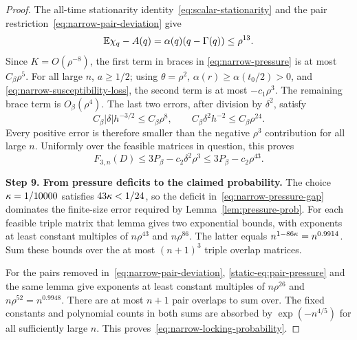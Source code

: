 \begin{proof}
The all-time stationarity identity~\eqref{eq:scalar-stationarity}
and the pair restriction~\eqref{eq:narrow-pair-deviation} give
\[
 \mathbb E\chi_q-A(q)=\alpha(q)(q-\Gamma(q))\le\rho^{13}.
\]
Since $K=O(\rho^{-8})$, the first term in braces in
\eqref{eq:narrow-pressure} is at most $C_\beta\rho^5$.
For all large $n$, $a\ge1/2$; using
$\theta=\rho^2$, $\alpha(r)\ge\alpha(t_0/2)>0$, and
\eqref{eq:narrow-susceptibility-loss}, the second term is at most
$-c_1\rho^3$. The remaining brace term is $O_\beta(\rho^4)$.
The last two errors, after division by $\delta^2$, satisfy
\[
 C_\beta|\delta|h^{-3/2}\le C_\beta\rho^8,
 \qquad
 C_\beta\delta^2h^{-2}\le C_\beta\rho^{24}.
\]
Every positive error is therefore smaller than the negative
$\rho^3$ contribution for all large $n$. Uniformly over the
feasible matrices in question, this proves
\begin{equation}\label{eq:narrow-pressure-gap}
 F_{3,n}(D)\le3P_\beta-c_2\delta^2\rho^3
             \le3P_\beta-c_2\rho^{43}.
\end{equation}

\par\medskip\noindent\textbf{Step 9. From pressure deficits to the claimed probability.}\enspace
The choice $\kappa=1/10000$ satisfies $43\kappa<1/24$, so the deficit
in~\eqref{eq:narrow-pressure-gap} dominates the finite-size error
required by Lemma~\ref{lem:pressure-prob}. For each feasible triple
matrix that lemma gives two exponential bounds, with exponents at
least constant multiples of $n\rho^{43}$ and $n\rho^{86}$.
The latter equals $n^{1-86\kappa}=n^{0.9914}$. Sum these bounds over
the at most $(n+1)^3$ triple overlap matrices.

For the pairs removed in~\eqref{eq:narrow-pair-deviation},
\eqref{static-eq:pair-pressure} and the same lemma give exponents at least
constant multiples of $n\rho^{26}$ and
$n\rho^{52}=n^{0.9948}$. There are at most $n+1$ pair overlaps
to sum over. The fixed constants and polynomial counts in both
sums are absorbed by $\exp(-n^{4/5})$ for all sufficiently large
$n$. This proves~\eqref{eq:narrow-locking-probability}.
\end{proof}
